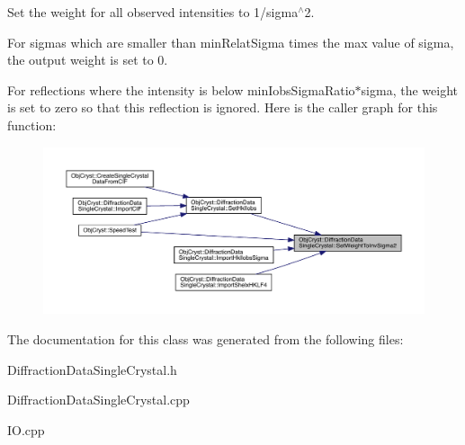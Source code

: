 Set the weight for all observed intensities to 1/sigma$^\wedge$2. 

For sigmas which are smaller than min\+Relat\+Sigma times the max value of sigma, the output weight is set to 0.

For reflections where the intensity is below min\+Iobs\+Sigma\+Ratio$\ast$sigma, the weight is set to zero so that this reflection is ignored. Here is the caller graph for this function\+:
\nopagebreak
\begin{figure}[H]
\begin{center}
\leavevmode
\includegraphics[width=350pt]{class_obj_cryst_1_1_diffraction_data_single_crystal_a76f0f6b9eab4f00b7fa9afc17e951235_icgraph}
\end{center}
\end{figure}


The documentation for this class was generated from the following files\+:\begin{DoxyCompactItemize}
\item 
Diffraction\+Data\+Single\+Crystal.\+h\item 
Diffraction\+Data\+Single\+Crystal.\+cpp\item 
I\+O.\+cpp\end{DoxyCompactItemize}
